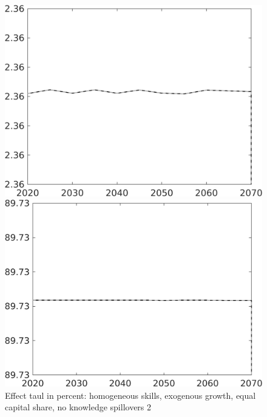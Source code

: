 \documentclass[12pt]{article}
\begin{document}
\begin{figure}[h!!]
	\centering
	\caption{Effect taul in percent: homogeneous skills, exogenous growth, equal capital share, no knowledge spillovers 2}\label{fig:LF_BAU_nsk1_xgr1_equalcapShare_noknow2}
	
	\begin{minipage}[]{0.32\textwidth}
		\includegraphics[width=1\textwidth]{../../codding_model/own_basedOnFried/optimalPol_010922_revision/figures/all_13Sept22/CompTaul_Equlab_LFBAU_Reg0_gAn_spillover0_nsk1_xgr1_knspil1_sep1_countec0_GovRev0_etaa0.79_lgd0.png}
	\end{minipage}	
	\begin{minipage}[]{0.32\textwidth}
		\includegraphics[width=1\textwidth]{../../codding_model/own_basedOnFried/optimalPol_010922_revision/figures/all_13Sept22/CompTaul_Equlab_LFBAU_Reg0_gAg_spillover0_nsk1_xgr1_knspil1_sep1_countec0_GovRev0_etaa0.79_lgd0.png}

\end{minipage}
\end{figure}
\end{document}
